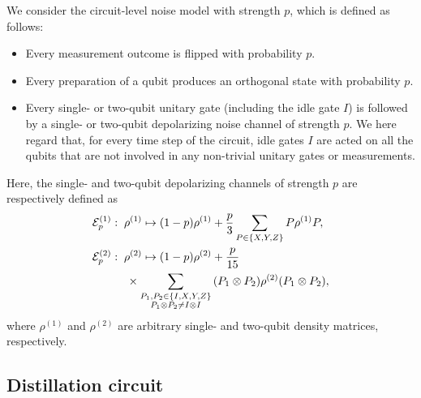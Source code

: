 \documentclass[
 prx,
 reprint,
 superscriptaddress,
 longbibliography,
 dvipsnames
]{revtex4-2}
\begin{document}
We consider the circuit-level noise model with strength $p$, which is defined as follows:
\begin{itemize}
    \item Every measurement outcome is flipped with probability $p$.
    \item Every preparation of a qubit produces an orthogonal state with probability $p$.
    \item Every single- or two-qubit unitary gate (including the idle gate $I$) is followed by a single- or two-qubit depolarizing noise channel of strength $p$. We here regard that, for every time step of the circuit, idle gates $I$ are acted on all the qubits that are not involved in any non-trivial unitary gates or measurements.
\end{itemize}
Here, the single- and two-qubit depolarizing channels of strength $p$ are respectively defined as
\begin{align*}
    &\mathcal{E}_{p}^{(1)}:\; \rho^{(1)} \mapsto (1 - p) \rho^{(1)} + \frac{p}{3} \sum_{P \in \qty{X, Y, Z}} P \rho^{(1)} P, \\ 
    &\mathcal{E}_{p}^{(2)}:\; \rho^{(2)} \mapsto (1 - p) \rho^{(2)} + \frac{p}{15} \\ 
    &\qquad\quad \times \sum_{\substack{P_1, P_2 \in \qty{I, X, Y, Z} \\ P_1 \otimes P_2 \neq I \otimes I}} \qty(P_1 \otimes P_2) \rho^{(2)} \qty(P_1 \otimes P_2),
\end{align*}
where $\rho^{(1)}$ and $\rho^{(2)}$ are arbitrary single- and two-qubit density matrices, respectively.

\subsection{Distillation circuit \label{subsec:distillation_circuit}}
\end{document}
